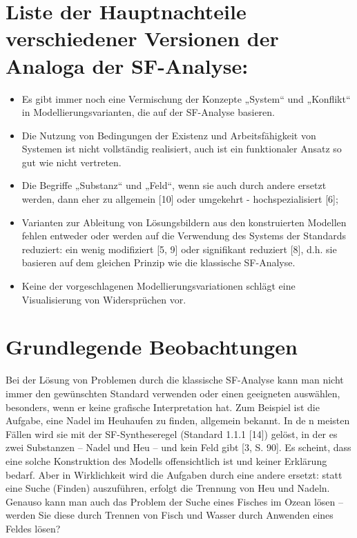 \documentclass[11pt,a4paper]{article}
\begin{document}
\section*{Liste der Hauptnachteile verschiedener Versionen der Analoga der
  SF-Analyse:}
\begin{itemize}
\item Es gibt immer noch eine Vermischung der Konzepte „System“ und „Konflikt“
  in Modellierungsvarianten, die auf der SF-Analyse basieren.
\item Die Nutzung von Bedingungen der Existenz und Arbeitsfähigkeit von
  Systemen ist nicht vollständig realisiert, auch ist ein funktionaler Ansatz
  so gut wie nicht vertreten.
\item Die Begriffe „Substanz“ und „Feld“, wenn sie auch durch andere ersetzt
  werden, dann eher zu allgemein [10] oder umgekehrt - hochspezialisiert [6];
\item Varianten zur Ableitung von Lösungsbildern aus den konstruierten
  Modellen fehlen entweder oder werden auf die Verwendung des Systems der
  Standards reduziert: ein wenig modifiziert [5, 9] oder signifikant reduziert
  [8], d.h. sie basieren auf dem gleichen Prinzip wie die klassische
  SF-Analyse.
\item Keine der vorgeschlagenen Modellierungsvariationen schlägt eine
  Visualisierung von Widersprüchen vor.
\end{itemize}

\section*{Grundlegende Beobachtungen}

Bei der Lösung von Problemen durch die klassische SF-Analyse kann man nicht
immer den gewünschten Standard verwenden oder einen geeigneten auswählen,
besonders, wenn er keine grafische Interpretation hat.  Zum Beispiel ist die
Aufgabe, eine Nadel im Heuhaufen zu finden, allgemein bekannt.  In de n
meisten Fällen wird sie mit der SF-Syntheseregel (Standard 1.1.1 [14]) gelöst,
in der es zwei Substanzen -- Nadel und Heu -- und kein Feld gibt [3, S. 90].
Es scheint, dass eine solche Konstruktion des Modells offensichtlich ist und
keiner Erklärung bedarf. Aber in Wirklichkeit wird die Aufgaben durch eine
andere ersetzt: statt eine Suche (Finden) auszuführen, erfolgt die Trennung
von Heu und Nadeln.  Genauso kann man auch das Problem der Suche eines Fisches
im Ozean lösen -- werden Sie diese durch Trennen von Fisch und Wasser durch
Anwenden eines Feldes lösen?
\end{document}
